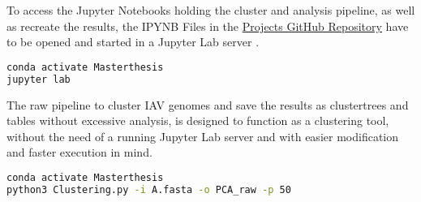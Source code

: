 
To access the Jupyter Notebooks holding the cluster and analysis pipeline, as well as recreate the results, the IPYNB Files in the \href{https://github.com/ahenoch/Masterthesis.git}{Projects GitHub Repository} have to be opened and started in a Jupyter Lab server \autocite{kluyver_jupyter_2016, perez_ipython_2007}.

\begin{lstlisting}[language=sh]
conda activate Masterthesis
jupyter lab
\end{lstlisting}  

The raw pipeline to cluster \gls{IAV} genomes and save the results as clustertrees and tables without excessive analysis, is designed to function as a clustering tool, without the need of a running Jupyter Lab server and with easier modification and faster execution in mind.

\begin{lstlisting}[language=sh]
conda activate Masterthesis
python3 Clustering.py -i A.fasta -o PCA_raw -p 50
\end{lstlisting}  


